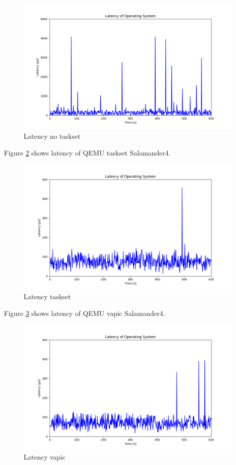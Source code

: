 \documentclass[MMR,Master,english]{twbook}
\begin{document}
\begin{figure}[H]
	\centering
	\includegraphics[width=0.75\columnwidth]{img/max_latency_default.png}
	\caption[Latency no taskset]{Latency no taskset}
	\label{fig:max_latency_default}
\end{figure}


Figure \ref{fig:max_latency_taskset} shows latency of QEMU taskset Salamander4.
\begin{figure}[H]
	\centering
	\includegraphics[width=0.75\columnwidth]{img/max_latency_taskset.png}
	\caption[Latency taskset]{Latency taskset}
	\label{fig:max_latency_taskset}
\end{figure}

Figure \ref{fig:max_latency_vapic} shows latency of QEMU vapic Salamander4.
\begin{figure}[H]
	\centering
	\includegraphics[width=0.75\columnwidth]{img/max_latency_vapic.png}
	\caption[Latency vapic]{Latency vapic}
	\label{fig:max_latency_vapic}
\end{figure}
\end{document}
